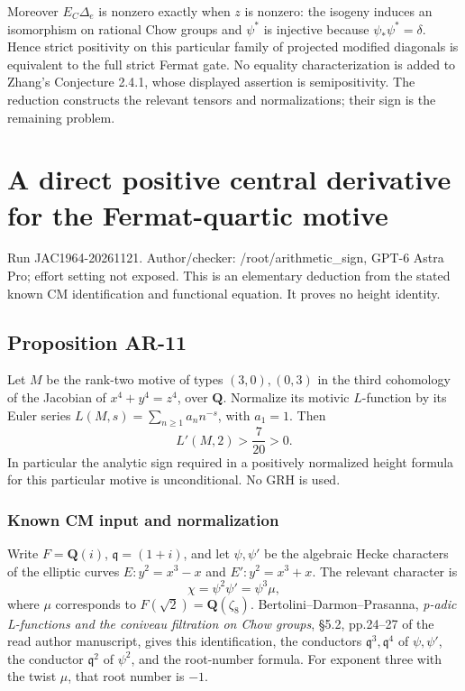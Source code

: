 \documentclass[11pt,a4paper]{article}
\begin{document}
Moreover $E_C\Delta_e$ is nonzero exactly when $z$ is nonzero:
the isogeny induces an isomorphism on rational Chow groups and
$\psi^*$ is injective because $\psi_*\psi^*=\delta$.  Hence strict
positivity on this particular family of projected modified
diagonals is equivalent to the full strict Fermat gate.  No
equality characterization is added to Zhang's Conjecture 2.4.1,
whose displayed assertion is semipositivity.  The reduction
constructs the relevant tensors and normalizations; their sign is
the remaining problem.
\section{A direct positive central derivative for the Fermat-quartic
motive}\label{a-direct-positive-central-derivative-for-the-fermat-quartic-motive}

Run JAC1964-20261121. Author/checker: /root/arithmetic\_sign, GPT-6
Astra Pro; effort setting not exposed. This is an elementary deduction
from the stated known CM identification and functional equation. It
proves no height identity.

\subsection{Proposition AR-11}\label{proposition-ar-11}

Let \(M\) be the rank-two motive of types \((3,0),(0,3)\) in the third
cohomology of the Jacobian of \(x^4+y^4=z^4\), over \(\mathbf Q\).
Normalize its motivic \(L\)-function by its Euler series
\(L(M,s)=\sum_{n\ge1}a_n n^{-s}\), with \(a_1=1\). Then \[
L'(M,2)>\frac7{20}>0.
\tag{AR.14}
\] In particular the analytic sign required in a positively normalized
height formula for this particular motive is unconditional. No GRH is
used.

\subsubsection{Known CM input and
normalization}\label{known-cm-input-and-normalization}

Write \(F=\mathbf Q(i)\), \(\mathfrak q=(1+i)\), and let \(\psi,\psi'\)
be the algebraic Hecke characters of the elliptic curves \(E:y^2=x^3-x\)
and \(E':y^2=x^3+x\). The relevant character is \[
\chi=\psi^2\psi'=\psi^3\mu,
\] where \(\mu\) corresponds to \(F(\sqrt2)=\mathbf Q(\zeta_8)\).
Bertolini--Darmon--Prasanna, \emph{p-adic L-functions and the coniveau
filtration on Chow groups}, §5.2, pp.24--27 of the read author
manuscript, gives this identification, the conductors
\(\mathfrak q^3,\mathfrak q^4\) of \(\psi,\psi'\), the conductor
\(\mathfrak q^2\) of \(\psi^2\), and the root-number formula. For
exponent three with the twist \(\mu\), that root number is \(-1\).
\end{document}
